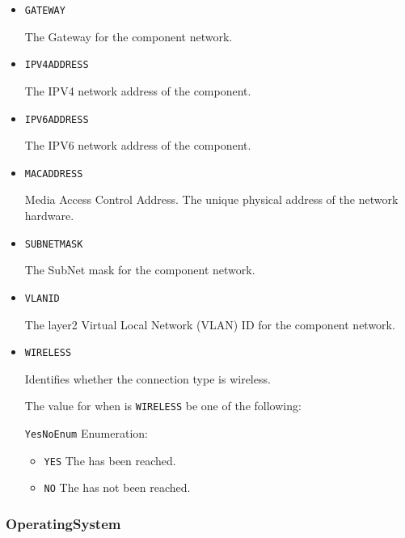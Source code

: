 \begin{itemize}

\item \texttt{GATEWAY}


The Gateway for the component network.

\item \texttt{IPV4\textunderscore ADDRESS}


The IPV4 network address of the component.


\item \texttt{IPV6\textunderscore ADDRESS}


The IPV6 network address of the component.


\item \texttt{MAC\textunderscore ADDRESS}


Media Access Control Address. The unique physical address of the network hardware.


\item \texttt{SUBNET\textunderscore MASK}


The SubNet mask for the component network.


\item \texttt{VLAN\textunderscore ID}


The layer2 Virtual Local Network (VLAN) ID for the component network.

\item \texttt{WIRELESS}


Identifies whether the connection type is wireless.


The value for  when  is \texttt{WIRELESS} \MUST be one of the following: 


\texttt{YesNoEnum} Enumeration:

\begin{itemize}
\item \texttt{YES} \newline The  has been reached. 
\item \texttt{NO} \newline The  has not been reached. 
\end{itemize}


\end{itemize}










\subsubsection{OperatingSystem}
\label{sec:OperatingSystem}



